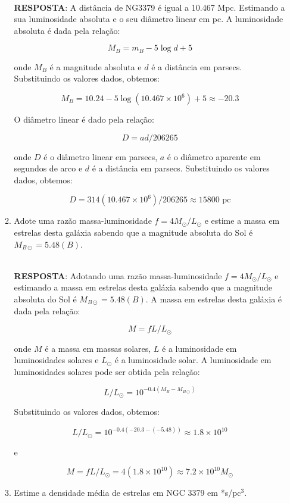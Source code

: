 \documentclass[a4paper,12pt]{article}
\begin{document}
\begin{enumerate}
\begin{enumerate}
\noindent\hrulefill\\\textbf{RESPOSTA}: A distância de NG3379 é igual a 10.467 Mpc. Estimando a sua luminosidade absoluta e o seu diâmetro linear em pc. A luminosidade absoluta é dada pela relação:

$$M_B = m_B - 5 \log d + 5$$

onde $M_B$ é a magnitude absoluta e $d$ é a distância em parsecs. Substituindo os valores dados, obtemos:

$$M_B = 10.24 - 5 \log (10.467 \times 10^6) + 5 \approx -20.3$$

O diâmetro linear é dado pela relação:

$$D = a d / 206265$$

onde $D$ é o diâmetro linear em parsecs, $a$ é o diâmetro aparente em segundos de arco e $d$ é a distância em parsecs. Substituindo os valores dados, obtemos:

$$D = 314 (10.467 \times 10^6) / 206265 \approx 15800 \text{ pc}$$

\noindent\hrulefill

\item Adote uma razão massa-luminosidade $f= 4M_\odot/L_\odot$ e estime a massa em estrelas desta galáxia sabendo que a magnitude absoluta do Sol é $M_{B\odot}=5.48(B)$.

\noindent\hrulefill\\\textbf{RESPOSTA}: Adotando uma razão massa-luminosidade $f= 4M_\odot/L_\odot$ e estimando a massa em estrelas desta galáxia sabendo que a magnitude absoluta do Sol é $M_{B\odot}=5.48(B)$. A massa em estrelas desta galáxia é dada pela relação:

$$M = f L / L_\odot$$

onde $M$ é a massa em massas solares, $L$ é a luminosidade em luminosidades solares e $L_\odot$ é a luminosidade solar. A luminosidade em luminosidades solares pode ser obtida pela relação:

$$L / L_\odot = 10^{-0.4(M_B - M_{B\odot})}$$

Substituindo os valores dados, obtemos:

$$L / L_\odot = 10^{-0.4(-20.3 - (-5.48))} \approx 1.8 \times 10^{10}$$

e

$$M = f L / L_\odot = 4 (1.8 \times 10^{10}) \approx 7.2 \times 10^{10} M_\odot$$

\noindent\hrulefill

\item Estime a densidade média de estrelas em NGC 3379 em *s/pc$^3$.


\end{enumerate}
\end{enumerate}
\end{document}

